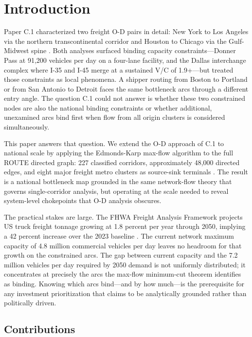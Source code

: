 \section{Introduction}
\label{sec:introduction}

Paper C.1 characterized two freight O-D pairs in detail: New York to Los Angeles via the northern transcontinental corridor and Houston to Chicago via the Gulf-Midwest spine \citep{ROUTE_C1}. Both analyses surfaced binding capacity constraints---Donner Pass at 91,200 vehicles per day on a four-lane facility, and the Dallas interchange complex where I-35 and I-45 merge at a sustained V/C of 1.9+---but treated those constraints as local phenomena. A shipper routing from Boston to Portland or from San Antonio to Detroit faces the same bottleneck arcs through a different entry angle. The question C.1 could not answer is whether these two constrained nodes are also the national binding constraints or whether additional, unexamined arcs bind first when flow from all origin clusters is considered simultaneously.

This paper answers that question. We extend the O-D approach of C.1 to national scale by applying the Edmonds-Karp max-flow algorithm to the full ROUTE directed graph: 227 classified corridors, approximately 48,000 directed edges, and eight major freight metro clusters as source-sink terminals \citep{FAF5_2023}. The result is a national bottleneck map grounded in the same network-flow theory that governs single-corridor analysis, but operating at the scale needed to reveal system-level chokepoints that O-D analysis obscures.

The practical stakes are large. The FHWA Freight Analysis Framework projects US truck freight tonnage growing at 1.8 percent per year through 2050, implying a 42 percent increase over the 2023 baseline \citep{FHWA_freight2023}. The current network maximum capacity of 4.8 million commercial vehicles per day leaves no headroom for that growth on the constrained arcs. The gap between current capacity and the 7.2 million vehicles per day required by 2050 demand is not uniformly distributed; it concentrates at precisely the arcs the max-flow minimum-cut theorem identifies as binding. Knowing which arcs bind---and by how much---is the prerequisite for any investment prioritization that claims to be analytically grounded rather than politically driven.

\subsection*{Contributions}

